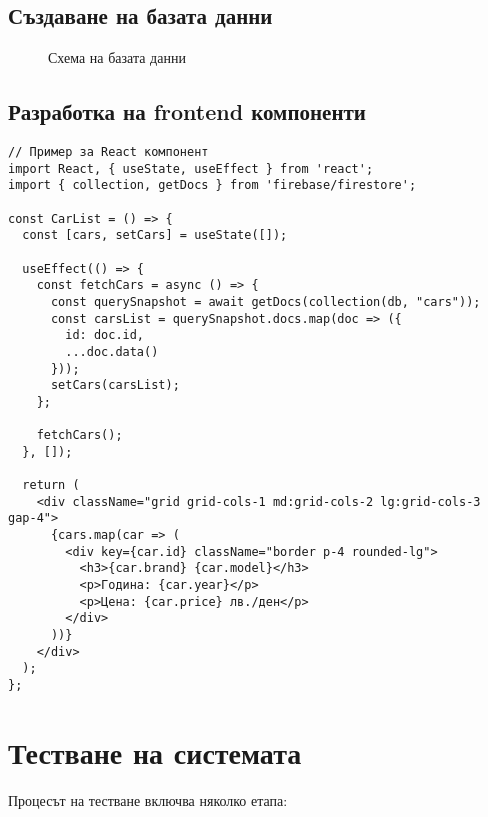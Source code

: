 \documentclass[12pt,a4paper]{article}
\begin{document}
\subsection{Създаване на базата данни}
\begin{figure}[h]
\centering
\caption{Схема на базата данни}
\end{figure}

\subsection{Разработка на frontend компоненти}
\begin{verbatim}
// Пример за React компонент
import React, { useState, useEffect } from 'react';
import { collection, getDocs } from 'firebase/firestore';

const CarList = () => {
  const [cars, setCars] = useState([]);
  
  useEffect(() => {
    const fetchCars = async () => {
      const querySnapshot = await getDocs(collection(db, "cars"));
      const carsList = querySnapshot.docs.map(doc => ({
        id: doc.id,
        ...doc.data()
      }));
      setCars(carsList);
    };
    
    fetchCars();
  }, []);
  
  return (
    <div className="grid grid-cols-1 md:grid-cols-2 lg:grid-cols-3 gap-4">
      {cars.map(car => (
        <div key={car.id} className="border p-4 rounded-lg">
          <h3>{car.brand} {car.model}</h3>
          <p>Година: {car.year}</p>
          <p>Цена: {car.price} лв./ден</p>
        </div>
      ))}
    </div>
  );
};
\end{verbatim}

\section{Тестване на системата}
Процесът на тестване включва няколко етапа:
\end{document}
